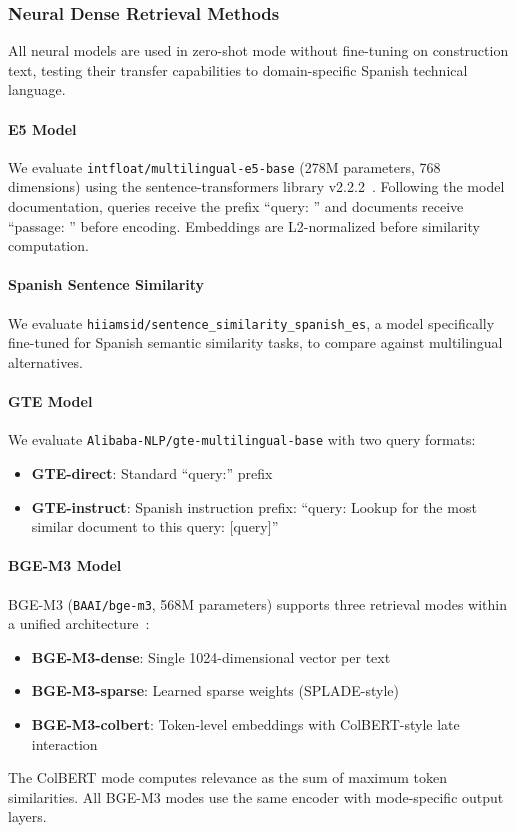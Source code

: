 \documentclass[preprint,12pt]{elsarticle}
\begin{document}
\subsubsection{Neural Dense Retrieval Methods}

All neural models are used in zero-shot mode without fine-tuning on construction text, testing their transfer capabilities to domain-specific Spanish technical language.

\paragraph{E5 Model}
We evaluate \texttt{intfloat/multilingual-e5-base} (278M parameters, 768 dimensions) using the sentence-transformers library v2.2.2~\citep{reimers2019sentence}. Following the model documentation, queries receive the prefix ``query: '' and documents receive ``passage: '' before encoding. Embeddings are L2-normalized before similarity computation.

\paragraph{Spanish Sentence Similarity}
We evaluate \texttt{hiiamsid/sentence\_similarity\_spanish\_es}, a model specifically fine-tuned for Spanish semantic similarity tasks, to compare against multilingual alternatives.

\paragraph{GTE Model}
We evaluate \texttt{Alibaba-NLP/gte-multilingual-base} with two query formats:
\begin{itemize}
    \item \textbf{GTE-direct}: Standard ``query:'' prefix
    \item \textbf{GTE-instruct}: Spanish instruction prefix: ``query: Lookup for the most similar document to this query: [query]''
\end{itemize}

\paragraph{BGE-M3 Model}
BGE-M3 (\texttt{BAAI/bge-m3}, 568M parameters) supports three retrieval modes within a unified architecture~\citep{chen2024bge}:
\begin{itemize}
    \item \textbf{BGE-M3-dense}: Single 1024-dimensional vector per text
    \item \textbf{BGE-M3-sparse}: Learned sparse weights (SPLADE-style)
    \item \textbf{BGE-M3-colbert}: Token-level embeddings with ColBERT-style late interaction
\end{itemize}
The ColBERT mode computes relevance as the sum of maximum token similarities. All BGE-M3 modes use the same encoder with mode-specific output layers.
\end{document}
